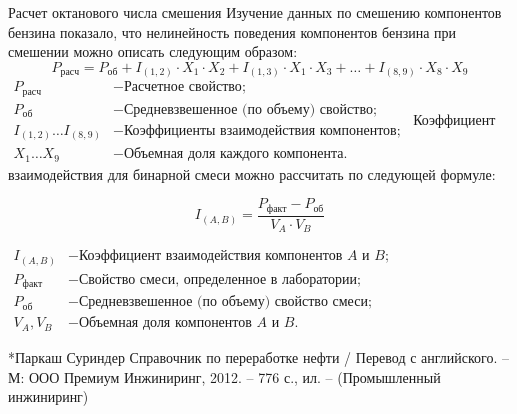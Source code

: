 \documentclass[aspectratio=169, mathserif]{beamer}%
\begin{document}
\begin{frame}[fragile, label=c]{Расчет октанового числа смешения}
\scriptsize
Изучение данных по смешению компонентов бензина показало, что нелинейность поведения компонентов бензина при смешении можно описать следующим образом:
\vfill
\begin{equation}
	P_{\mathrm{расч}} = P_{\mathrm{об}} + I_{\left(1,2\right)} \cdot X_1 \cdot X_2 + I_{\left(1,3\right)} \cdot X_1 \cdot X_3 + \ldots + I_{\left(8,9\right)} \cdot X_8 \cdot X_9
\end{equation}
\vfill
$
\begin{aligned}
P_{\mathrm{расч}} & -  \text{Расчетное свойство}; \\
P_{\mathrm{об}} & - \text{Средневзвешенное (по объему) свойство}; \\
I_{\left(1,2\right)} \ldots I_{\left(8,9\right)} & - \text{Коэффициенты взаимодействия компонентов}; \\
X_1 \ldots X_9 & - \text{Объемная доля каждого компонента}.
\end{aligned}
$
\vfill
Коэффициент взаимодействия для бинарной смеси можно рассчитать по следующей формуле:
\vfill
\begin{minipage}{.39\textwidth}
\begin{equation}
	I_{\left(A,B\right)} = \dfrac{P_{\mathrm{факт}}-P_{\mathrm{об}}}{V_A \cdot V_B}
\end{equation}
\end{minipage}
\begin{minipage}{.05\textwidth}
\hfill
\end{minipage}
\begin{minipage}{.49\textwidth}
$
\begin{aligned}
I_{\left(A,B\right)} &- \text{Коэффициент взаимодействия компонентов $A$ и $B$}; \\
P_{\mathrm{факт}} &- \text{Свойство смеси, определенное в лаборатории}; \\
P_{\mathrm{об}} &- \text{Средневзвешенное (по объему) свойство смеси}; \\
V_A, V_B &- \text{Объемная доля компонентов $A$ и $B$}.
\end{aligned}
$
\end{minipage}
\vfill
\tiny{*Паркаш Суриндер Справочник по переработке нефти / Перевод с английского. – М: ООО Премиум Инжиниринг, 2012. – 776 с., ил. – (Промышленный инжиниринг)}
\vfill
\end{frame}
\end{document}
